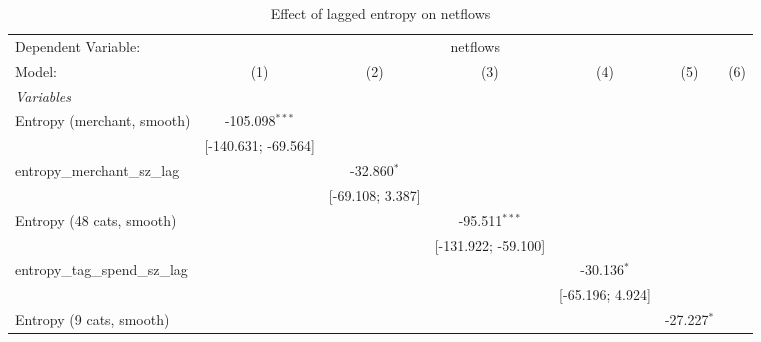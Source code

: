 
\begin{table}[htbp]
   \centering
   \tiny
   \begin{threeparttable}[b]
      \caption{\label{tab:reg_netflows_lagged_sz} Effect of lagged entropy on netflows}
      \begin{tabular}{lcccccc}
         \tabularnewline \midrule \midrule
         Dependent Variable: & \multicolumn{6}{c}{netflows}\\
         Model:                           & (1)                  & (2)                  & (3)                  & (4)                  & (5)                  & (6)\\  
         \midrule
         \emph{Variables}\\
         Entropy (merchant, smooth)       & -105.098$^{***}$     &                      &                      &                      &                      &   \\   
                                          & [-140.631; -69.564]  &                      &                      &                      &                      &   \\   
         entropy\_merchant\_sz\_lag       &                      & -32.860$^{*}$        &                      &                      &                      &   \\   
                                          &                      & [-69.108; 3.387]     &                      &                      &                      &   \\   
         Entropy (48 cats, smooth)        &                      &                      & -95.511$^{***}$      &                      &                      &   \\   
                                          &                      &                      & [-131.922; -59.100]  &                      &                      &   \\   
         entropy\_tag\_spend\_sz\_lag     &                      &                      &                      & -30.136$^{*}$        &                      &   \\   
                                          &                      &                      &                      & [-65.196; 4.924]     &                      &   \\   
         Entropy (9 cats, smooth)         &                      &                      &                      &                      & -27.227$^{*}$        &   \\   

\end{tabular}
\end{threeparttable}
\end{table}
